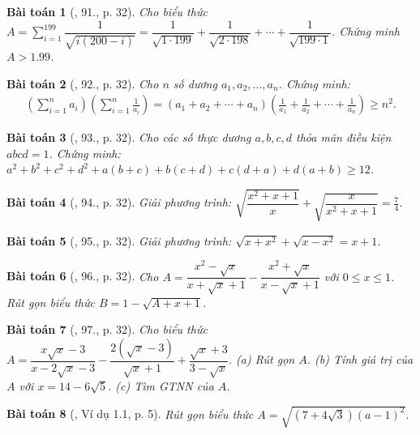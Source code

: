 \documentclass{article}
\newtheorem{baitoan}{Bài toán}
\begin{document}
\begin{baitoan}[\cite{Tuyen_Toan_9}, 91., p. 32]
	Cho biểu thức $A = \sum_{i=1}^{199} \dfrac{1}{\sqrt{i(200 - i)}} = \dfrac{1}{\sqrt{1\cdot199}} + \dfrac{1}{\sqrt{2\cdot198}} + \cdots + \dfrac{1}{\sqrt{199\cdot1}}$. Chứng minh $A > 1.99$.
\end{baitoan}

\begin{baitoan}[\cite{Tuyen_Toan_9}, 92., p. 32]
	Cho $n$ số dương $a_1,a_2,\ldots,a_n$. Chứng minh:
	\begin{align*}
		\left(\sum_{i=1}^n a_i\right)\left(\sum_{i=1}^n \frac{1}{a_i}\right) = (a_1 + a_2 + \cdots + a_n)\left(\frac{1}{a_1} + \frac{1}{a_2} + \cdots + \frac{1}{a_n}\right)\ge n^2.
	\end{align*}
\end{baitoan}

\begin{baitoan}[\cite{Tuyen_Toan_9}, 93., p. 32]
	Cho các số thực dương $a,b,c,d$ thỏa mãn điều kiện $abcd = 1$. Chứng minh: $a^2 + b^2 + c^2 + d^2+ a(b + c) + b(c + d) + c(d + a) + d(a + b)\ge12$.
\end{baitoan}

\begin{baitoan}[\cite{Tuyen_Toan_9}, 94., p. 32]
	Giải phương trình: $\sqrt{\dfrac{x^2 + x + 1}{x}} + \sqrt{\dfrac{x}{x^2 + x + 1}} = \frac{7}{4}$.
\end{baitoan}

\begin{baitoan}[\cite{Tuyen_Toan_9}, 95., p. 32]
	Giải phương trình: $\sqrt{x + x^2} + \sqrt{x - x^2} = x + 1$.
\end{baitoan}

\begin{baitoan}[\cite{Tuyen_Toan_9}, 96., p. 32]
	Cho $A = \dfrac{x^2 - \sqrt{x}}{x + \sqrt{x} + 1} - \dfrac{x^2 + \sqrt{x}}{x - \sqrt{x} + 1}$ với $0\le x\le 1$. Rút gọn biểu thức $B = 1 - \sqrt{A + x + 1}$.
\end{baitoan}

\begin{baitoan}[\cite{Tuyen_Toan_9}, 97., p. 32]
	Cho biểu thức $A = \dfrac{x\sqrt{x} - 3}{x - 2\sqrt{x} - 3} - \dfrac{2(\sqrt{x} - 3)}{\sqrt{x} + 1} + \dfrac{\sqrt{x} + 3}{3 - \sqrt{x}}$. (a) Rút gọn $A$. (b) Tính giá trị của $A$ với $x = 14 - 6\sqrt{5}$. (c) Tìm GTNN của $A$.
\end{baitoan}

\begin{baitoan}[\cite{TLCT_THCS_Toan_9_dai_so}, Ví dụ 1.1, p. 5]
	Rút gọn biểu thức $A = \sqrt{(7 + 4\sqrt{3})(a - 1)^2}$.
\end{baitoan}
\end{document}
